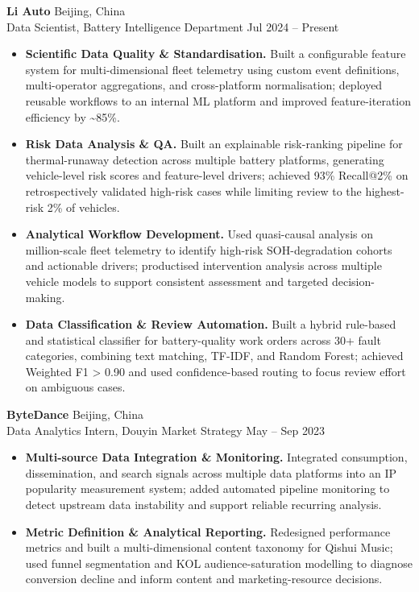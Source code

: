 \documentclass[a4paper,10pt]{article}
\begin{document}
\noindent\textbf{Li Auto} \hfill Beijing, China\\
Data Scientist, Battery Intelligence Department \hfill Jul 2024 -- Present
\begin{itemize}
    \item \textbf{Scientific Data Quality \& Standardisation.} Built a configurable feature system for multi-dimensional fleet telemetry using custom event definitions, multi-operator aggregations, and cross-platform normalisation; deployed reusable workflows to an internal ML platform and improved feature-iteration efficiency by \textasciitilde85\%.

    \item \textbf{Risk Data Analysis \& QA.} Built an explainable risk-ranking pipeline for thermal-runaway detection across multiple battery platforms, generating vehicle-level risk scores and feature-level drivers; achieved 93\% Recall@2\% on retrospectively validated high-risk cases while limiting review to the highest-risk 2\% of vehicles.

    \item \textbf{Analytical Workflow Development.} Used quasi-causal analysis on million-scale fleet telemetry to identify high-risk SOH-degradation cohorts and actionable drivers; productised intervention analysis across multiple vehicle models to support consistent assessment and targeted decision-making.

    \item \textbf{Data Classification \& Review Automation.} Built a hybrid rule-based and statistical classifier for battery-quality work orders across 30+ fault categories, combining text matching, TF-IDF, and Random Forest; achieved Weighted F1 > 0.90 and used confidence-based routing to focus review effort on ambiguous cases.
\end{itemize}

\vspace{2pt}
\noindent\textbf{ByteDance} \hfill Beijing, China\\
Data Analytics Intern, Douyin Market Strategy \hfill May -- Sep 2023
\begin{itemize}
    \item \textbf{Multi-source Data Integration \& Monitoring.} Integrated consumption, dissemination, and search signals across multiple data platforms into an IP popularity measurement system; added automated pipeline monitoring to detect upstream data instability and support reliable recurring analysis.

    \item \textbf{Metric Definition \& Analytical Reporting.} Redesigned performance metrics and built a multi-dimensional content taxonomy for Qishui Music; used funnel segmentation and KOL audience-saturation modelling to diagnose conversion decline and inform content and marketing-resource decisions.
\end{itemize}
\end{document}
